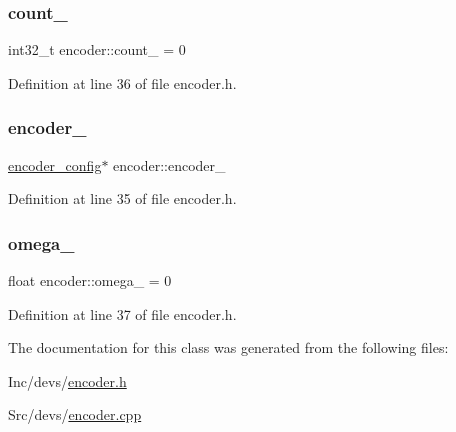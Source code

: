 \subsubsection{\texorpdfstring{count\_}{count\_}}
{\footnotesize\ttfamily int32\+\_\+t encoder\+::count\+\_\+ = 0\hspace{0.3cm}{\ttfamily [private]}}



Definition at line 36 of file encoder.\+h.

\mbox{\label{classencoder_aa59894d07cce9165245828c4e00c92e9}} 
\subsubsection{\texorpdfstring{encoder\_}{encoder\_}}
{\footnotesize\ttfamily \mbox{\hyperlink{structencoder__config}{encoder\+\_\+config}}$\ast$ encoder\+::encoder\+\_\+\hspace{0.3cm}{\ttfamily [private]}}



Definition at line 35 of file encoder.\+h.

\mbox{\label{classencoder_ab5cf8c446a23b0676547586f838e754d}} 
\subsubsection{\texorpdfstring{omega\_}{omega\_}}
{\footnotesize\ttfamily float encoder\+::omega\+\_\+ = 0\hspace{0.3cm}{\ttfamily [private]}}



Definition at line 37 of file encoder.\+h.



The documentation for this class was generated from the following files\+:\begin{DoxyCompactItemize}
\item 
Inc/devs/\mbox{\hyperlink{encoder_8h}{encoder.\+h}}\item 
Src/devs/\mbox{\hyperlink{encoder_8cpp}{encoder.\+cpp}}\end{DoxyCompactItemize}
